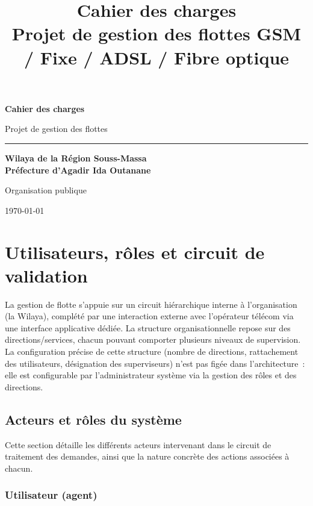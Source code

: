 \documentclass[11pt,a4paper]{article}
\title{\textbf{\Huge Cahier des charges}\\[0.5em]
\Large Projet de gestion des flottes GSM / Fixe / ADSL / Fibre optique}
\author{}
\date{}
\begin{document}
\begin{titlepage}
\centering
\vspace*{2cm}
{\Huge\bfseries\color{primaryblue} Cahier des charges\par}
\vspace{1cm}
{\Large Projet de gestion des flottes\par}
\vspace{1.5cm}
{\color{primaryblue}\rule{0.6\textwidth}{0.4pt}\par}
\vspace{1.5cm}
{\large\bfseries Wilaya de la Région Souss-Massa\\
Préfecture d'Agadir Ida Outanane\par}
\vspace{2cm}
{\normalsize Organisation publique\par}
\vspace{0.5cm}
{\normalsize \today\par}

\vfill
\end{titlepage}

\tableofcontents
\thispagestyle{fancy}
\newpage

\section{Utilisateurs, rôles et circuit de validation}

La gestion de flotte s'appuie sur un circuit hiérarchique interne à l'organisation (la Wilaya), complété par une interaction externe avec l'opérateur télécom via une interface applicative dédiée. La structure organisationnelle repose sur des directions/services, chacun pouvant comporter plusieurs niveaux de supervision. La configuration précise de cette structure (nombre de directions, rattachement des utilisateurs, désignation des superviseurs) n'est pas figée dans l'architecture~: elle est configurable par l'administrateur système via la gestion des rôles et des directions.

\subsection{Acteurs et rôles du système}

Cette section détaille les différents acteurs intervenant dans le circuit de traitement des demandes, ainsi que la nature concrète des actions associées à chacun.

\subsubsection{Utilisateur (agent)}
\end{document}
